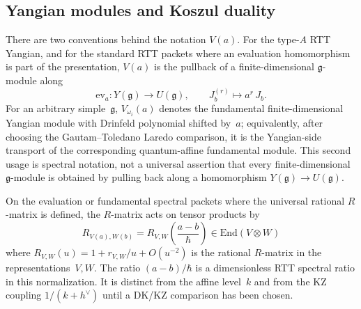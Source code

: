 \subsection{Yangian modules and Koszul duality}

\begin{definition}\label{def:yangian-evaluation}
There are two conventions behind the notation $V(a)$.
For the type-$A$ RTT Yangian, and for the standard RTT packets where an
evaluation homomorphism is part of the presentation, $V(a)$ is the
pullback of a finite-dimensional $\mathfrak{g}$-module along
\[
\mathrm{ev}_a\colon Y(\mathfrak{g}) \to U(\mathfrak{g}),
\qquad
J^{(r)}_b \mapsto a^r\, J_b .
\]
For an arbitrary simple~$\mathfrak g$, $V_{\omega_i}(a)$ denotes the
fundamental finite-dimensional Yangian module with Drinfeld polynomial
shifted by~$a$; equivalently, after choosing the
Gautam--Toledano Laredo comparison, it is the Yangian-side transport
of the corresponding quantum-affine fundamental module.  This second
usage is spectral notation, not a universal assertion that every
finite-dimensional $\mathfrak g$-module is obtained by pulling back
along a homomorphism $Y(\mathfrak g)\to U(\mathfrak g)$.

On the evaluation or fundamental spectral packets where the universal
rational $R$-matrix is defined, the $R$-matrix acts on tensor products by
\begin{equation}\label{eq:yangian-r-matrix}
R_{V(a), W(b)}
= R_{V,W}\!\left(\frac{a - b}{\hbar}\right)
\in \mathrm{End}(V \otimes W)
\end{equation}
where $R_{V,W}(u) = 1 + r_{V,W}/u + O(u^{-2})$ is the rational
$R$-matrix in the representations~$V, W$.
The ratio $(a-b)/\hbar$ is a dimensionless RTT spectral ratio in this
normalization. It is distinct from the affine level~$k$ and from the
KZ coupling $1/(k+h^\vee)$ until a DK/KZ comparison has been chosen.
\end{definition}

